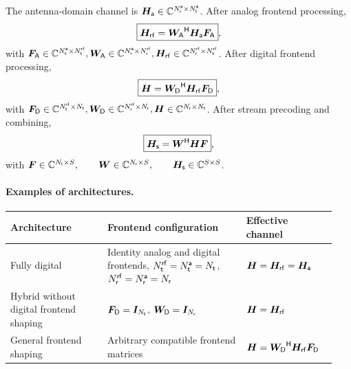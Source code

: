 \newline
The antenna-domain channel is $	\Ha \in \compl^{\NRa \times \NTa}$. 
After analog frontend processing,
\begin{equation}\label{eq:Hrf_def}
	\boxed{
		\Hrf = \mH{\WA}\Ha\FA},
\end{equation}
with $\FA \in \compl^{\NTa \times \NTrf},
\WA \in \compl^{\NRa \times \NRrf},
\Hrf \in \compl^{\NRrf \times \NTrf}$. After digital frontend processing,
\begin{equation}\label{eq:H_def}
	\boxed{
		\ma{H} = \mH{\WD}\Hrf\FD},
\end{equation}
with $\FD \in \compl^{\NTrf \times \NT},
\WD \in \compl^{\NRrf \times \NR},
\ma{H} \in \compl^{\NR \times \NT}$. 
After stream precoding and combining,
\begin{equation}\label{eq:Hs_def}
	\boxed{
		\Hs = \mH{\ma{W}}\ma{H}\ma{F}},
\end{equation}
with $\ma{F} \in \compl^{\NT \times \NS},
\qquad
\ma{W} \in \compl^{\NR \times \NS},
\qquad
\Hs \in \compl^{\NS \times \NS}$.
\begin{center}
\end{center}

\paragraph{Examples of architectures.}

\begin{center}
	\small
	\begin{tabular}{@{}p{0.28\linewidth}
			p{0.40\linewidth}
			p{0.26\linewidth}@{}}
		\toprule
		Architecture & Frontend configuration & Effective channel\\
		\midrule
		Fully digital
		& Identity analog and digital frontends,
		$\NTrf=\NTa=\NT$,
		$\NRrf=\NRa=\NR$
		& $\ma{H}=\Hrf=\Ha$\\[1mm]
		
		Hybrid without digital frontend shaping
		& $\FD=\ma{I}_{\NT}$,
		$\WD=\ma{I}_{\NR}$
		& $\ma{H}=\Hrf$\\[1mm]
		
		General frontend shaping
		& Arbitrary compatible frontend matrices
		& $\ma{H}=\mH{\WD}\Hrf\FD$\\
		\bottomrule
	\end{tabular}
\end{center}


